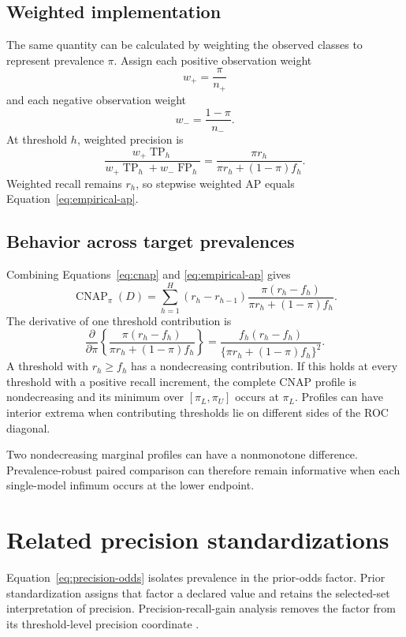 \documentclass[11pt]{article}
\newcommand{\CNAP}{\operatorname{CNAP}}
\theoremstyle{remark}
\begin{document}
\subsection{Weighted implementation}

The same quantity can be calculated by weighting the observed classes to represent prevalence $\pi$. Assign each positive observation weight
\[
w_+=\frac{\pi}{n_+}
\]
and each negative observation weight
\[
w_-=\frac{1-\pi}{n_-}.
\]
At threshold $h$, weighted precision is
\[
\frac{w_+\operatorname{TP}_h}
{w_+\operatorname{TP}_h+w_-\operatorname{FP}_h}
=
\frac{\pi r_h}
{\pi r_h+(1-\pi)f_h}.
\]
Weighted recall remains $r_h$, so stepwise weighted AP equals Equation~\eqref{eq:empirical-ap}.

\subsection{Behavior across target prevalences}

Combining Equations~\eqref{eq:cnap} and \eqref{eq:empirical-ap} gives
\begin{equation}
\CNAP_\pi(D)
=
\sum_{h=1}^{H}
(r_h-r_{h-1})
\frac{\pi(r_h-f_h)}
{\pi r_h+(1-\pi)f_h}.
\label{eq:empirical-cnap-profile}
\end{equation}
The derivative of one threshold contribution is
\begin{equation}
\frac{\partial}{\partial\pi}
\left\{
\frac{\pi(r_h-f_h)}
{\pi r_h+(1-\pi)f_h}
\right\}
=
\frac{f_h(r_h-f_h)}
{\{\pi r_h+(1-\pi)f_h\}^2}.
\label{eq:profile-derivative}
\end{equation}
A threshold with $r_h\geq f_h$ has a nondecreasing contribution. If this holds at every threshold with a positive recall increment, the complete CNAP profile is nondecreasing and its minimum over $[\pi_L,\pi_U]$ occurs at $\pi_L$. Profiles can have interior extrema when contributing thresholds lie on different sides of the ROC diagonal.

Two nondecreasing marginal profiles can have a nonmonotone difference. Prevalence-robust paired comparison can therefore remain informative when each single-model infimum occurs at the lower endpoint.

\section{Related precision standardizations}
\label{app:related}

Equation~\eqref{eq:precision-odds} isolates prevalence in the prior-odds factor. Prior standardization assigns that factor a declared value and retains the selected-set interpretation of precision. Precision-recall-gain analysis removes the factor from its threshold-level precision coordinate \cite{flach2015prg}.
\end{document}
